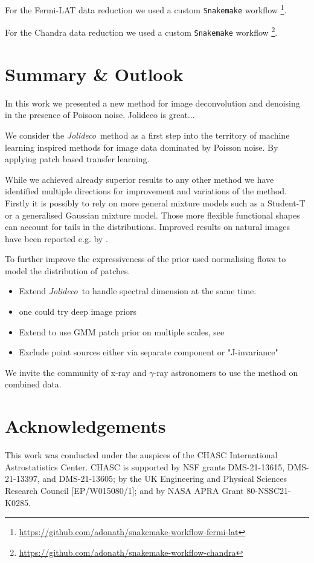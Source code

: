 \documentclass[twocolumn]{aastex631}
\newcommand{\jolideco}{\textit{Jolideco}~}
\newcommand{\gammaray}{$\gamma$-ray\xspace}
\begin{document}
    For the Fermi-LAT data reduction we used a custom \texttt{Snakemake} workflow \footnote{\url{https://github.com/adonath/snakemake-workflow-fermi-lat}}.

    For the Chandra data reduction we used a custom \texttt{Snakemake} workflow \footnote{\url{https://github.com/adonath/snakemake-workflow-chandra}}.
        
    
    \section{Summary \& Outlook}
    In this work we presented a new method for image deconvolution and denoising in the presence of Poisoon noise.
    Jolideco is great...

    We consider the \jolideco method as a first step into the territory of machine learning inspired methods for image data 
    dominated by Poisson noise. By applying patch based transfer learning. 

    While we achieved already superior results to any other method we have identified multiple directions for improvement and variations of the method. Firstly it is possibly to rely on more general mixture models such as a Student-T or a generalised Gaussian mixture model. Those more flexible functional shapes can account for tails in the distributions. Improved results
    on natural images have been reported e.g. by \cite{}.

    To further improve the expressiveness of the prior \cite{Altekrueger2022} used normalising flows to model the distribution of patches.

    
    
    \begin{itemize}
        \item Extend \jolideco to handle spectral dimension at the same time.
        \item one could try deep image priors \citep{Ulyanov2017}
        \item Extend to use GMM patch prior on multiple scales, see \cite{Papyan2015}
        \item Exclude point sources either via separate component or "J-invariance"
    \end{itemize}

    We invite the community of x-ray and \gammaray astronomers to use the method on combined data. 

    \section*{Acknowledgements}
    This work was conducted under the auspices of the CHASC International Astrostatistics Center.
    CHASC is supported by NSF grants DMS-21-13615, DMS-21-13397, and DMS-21-13605; by the UK Engineering
    and Physical Sciences Research Council [EP/W015080/1]; and by NASA APRA Grant 80-NSSC21-K0285.
    
\end{document}
